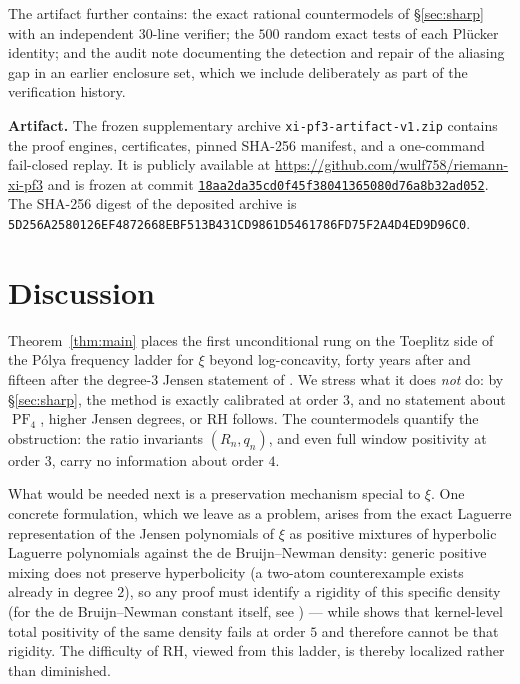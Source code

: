 \documentclass[11pt]{amsart}
\theoremstyle{definition}
\theoremstyle{remark}
\DeclareMathOperator{\PF}{PF}
\begin{document}
The artifact further contains: the exact rational countermodels of
\S\ref{sec:sharp} with an independent $30$-line verifier; the $500$
random exact tests of each Pl\"ucker identity; and the audit note
documenting the detection and repair of the aliasing gap in an earlier
enclosure set, which we include deliberately as part of the
verification history.

\smallskip
\noindent\textbf{Artifact.} The frozen supplementary archive
\texttt{xi-pf3-artifact-v1.zip} contains the proof engines,
certificates, pinned SHA-256 manifest, and a one-command fail-closed
replay. It is publicly available at
\url{https://github.com/wulf758/riemann-xi-pf3} and is frozen at commit
\href{https://github.com/wulf758/riemann-xi-pf3/commit/18aa2da35cd0f45f38041365080d76a8b32ad052}{\texttt{18aa2da35cd0f45f38041365080d76a8b32ad052}}.
The SHA-256 digest of the deposited archive is
\texttt{5D256A2580126EF4872668EBF513B431CD9861D5461786FD75F2A4D4ED9D96C0}.

\section{Discussion}\label{sec:discussion}

Theorem~\ref{thm:main} places the first unconditional rung on the
Toeplitz side of the P\'olya frequency ladder for $\xi$ beyond
log-concavity, forty years after \cite{CNV86} and fifteen after the
degree-$3$ Jensen statement of \cite{DL11}. We stress what it does
\emph{not} do: by \S\ref{sec:sharp}, the method is exactly calibrated
at order $3$, and no statement about $\PF_4$, higher Jensen degrees, or
RH follows. The countermodels quantify the obstruction: the ratio
invariants $(R_n,q_n)$, and even full window positivity at order $3$,
carry no information about order $4$.

What would be needed next is a preservation mechanism special to
$\xi$. One concrete formulation, which we leave as a problem, arises
from the exact Laguerre representation of the Jensen polynomials of
$\xi$ as positive mixtures of hyperbolic Laguerre polynomials against
the de Bruijn--Newman density: generic positive mixing does not
preserve hyperbolicity (a two-atom counterexample exists already in
degree $2$), so any proof must identify a rigidity of this specific
density (for the de Bruijn--Newman constant itself, see
\cite{RodgersTao}) --- while \cite{Michalowski26} shows that kernel-level total
positivity of the same density fails at order $5$ and therefore cannot
be that rigidity. The difficulty of RH, viewed from this ladder, is
thereby localized rather than diminished.
\end{document}
